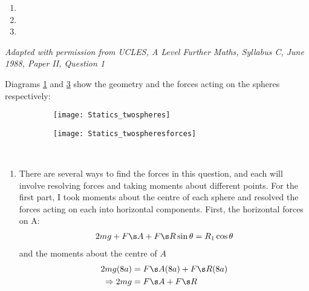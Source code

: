 \begin{problem} [A1988FMIIQ1a]
{\begin{enumerate}
	\item {}
	\item {}
	\item {}
\end{enumerate}}
{\textit{Adapted with permission from UCLES, A Level Further Maths, Syllabus C, June 1988, Paper II, Question 1}}
{\answer[a]{}
Diagrams \ref{fig:Statics_twospheres} and \ref{fig:Statics_twospheresforces} show the geometry and the forces acting on the spheres respectively:
\begin{figure}[h]
\centering
\begin{subfigure}{0.5\textwidth}
\centering
\texttt{[image: Statics\_twospheres]}
\caption{}
\label{fig:Statics_twospheres}
\end{subfigure}%
\begin{subfigure}{0.5\textwidth}
\centering
\texttt{[image: Statics\_twospheresforces]}
\caption{}
\label{fig:Statics_twospheresforces}
\end{subfigure}
\caption{}
\end{figure}
\\
\begin{enumerate}
\item
There are several ways to find the forces in this question, and each will involve resolving forces and taking moments about different points. For the first part, I took moments about the centre of each sphere and resolved the forces acting on each into horizontal components. First, the horizontal forces on A:
\begin{align}
2mg+F\s A+F\s R \sin\theta=R_1\cos\theta \label{eq:Statics_twospheres1}
\end{align}
and the moments about the centre of $A$
\begin{align}
2mg(8a)&=F\s A(8a)+F\s R(8a) \notag \\
\Rightarrow 2mg&=F\s A +F\s R \label{eq:Statics_twospheres2}
\end{align}

\end{enumerate}}
\end{problem}
